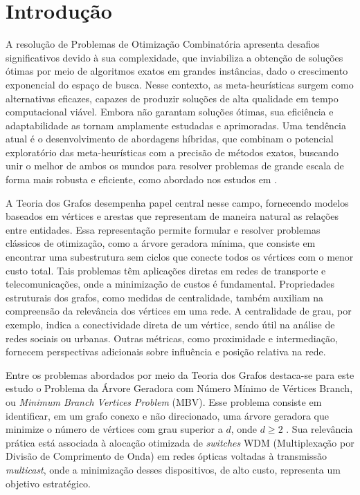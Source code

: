 \section{Introdução}
\label{sec-intro}

A resolução de Problemas de Otimização Combinatória apresenta desafios significativos devido à sua complexidade, que inviabiliza a obtenção de soluções ótimas por meio de algoritmos exatos em grandes instâncias, dado o crescimento exponencial do espaço de busca. Nesse contexto, as meta-heurísticas surgem como alternativas eficazes, capazes de produzir soluções de alta qualidade em tempo computacional viável. Embora não garantam soluções ótimas, sua eficiência e adaptabilidade as tornam amplamente estudadas e aprimoradas. Uma tendência atual é o desenvolvimento de abordagens híbridas, que combinam o potencial exploratório das meta-heurísticas com a precisão de métodos exatos, buscando unir o melhor de ambos os mundos para resolver problemas de grande escala de forma mais robusta e eficiente, como abordado nos estudos em \cite{Puchinger:2005}.

A Teoria dos Grafos desempenha papel central nesse campo, fornecendo modelos baseados em vértices e arestas que representam de maneira natural as relações entre entidades. Essa representação permite formular e resolver problemas clássicos de otimização, como a árvore geradora mínima, que consiste em encontrar uma subestrutura sem ciclos que conecte todos os vértices com o menor custo total. Tais problemas têm aplicações diretas em redes de transporte e telecomunicações, onde a minimização de custos é fundamental. Propriedades estruturais dos grafos, como medidas de centralidade, também auxiliam na compreensão da relevância dos vértices em uma rede. A centralidade de grau, por exemplo, indica a conectividade direta de um vértice, sendo útil na análise de redes sociais ou urbanas. Outras métricas, como proximidade e intermediação, fornecem perspectivas adicionais sobre influência e posição relativa na rede.

Entre os problemas abordados por meio da Teoria dos Grafos destaca-se para este estudo o Problema da Árvore Geradora com Número Mínimo de Vértices Branch, ou \textit{Minimum Branch Vertices Problem} (MBV). Esse problema consiste em identificar, em um grafo conexo e não direcionado, uma árvore geradora que minimize o número de vértices com grau superior a $d$, onde $d \ge 2$ . Sua relevância prática está associada à alocação otimizada de \textit{switches} WDM (Multiplexação por Divisão de Comprimento de Onda) em redes ópticas voltadas à transmissão \textit{multicast}, onde a minimização desses dispositivos, de alto custo, representa um objetivo estratégico.

